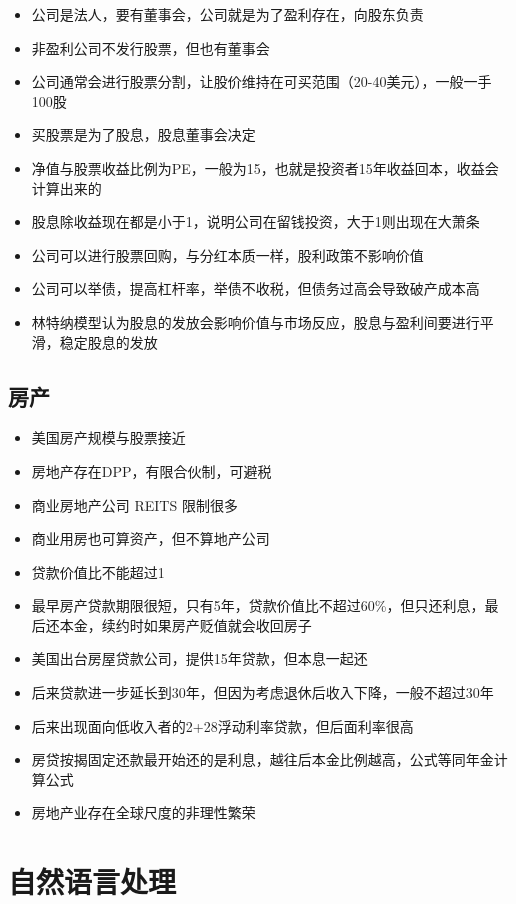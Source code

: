 \documentclass[]{book}
\providecommand{\tightlist}{%
  \setlength{\itemsep}{0pt}\setlength{\parskip}{0pt}}
\begin{document}
\begin{itemize}
\tightlist
\item
  公司是法人，要有董事会，公司就是为了盈利存在，向股东负责
\item
  非盈利公司不发行股票，但也有董事会
\item
  公司通常会进行股票分割，让股价维持在可买范围（20-40美元），一般一手100股
\item
  买股票是为了股息，股息董事会决定
\item
  净值与股票收益比例为PE，一般为15，也就是投资者15年收益回本，收益会计算出来的
\item
  股息除收益现在都是小于1，说明公司在留钱投资，大于1则出现在大萧条
\item
  公司可以进行股票回购，与分红本质一样，股利政策不影响价值
\item
  公司可以举债，提高杠杆率，举债不收税，但债务过高会导致破产成本高
\item
  林特纳模型认为股息的发放会影响价值与市场反应，股息与盈利间要进行平滑，稳定股息的发放
\end{itemize}

\section{房产}

\begin{itemize}
\tightlist
\item
  美国房产规模与股票接近
\item
  房地产存在DPP，有限合伙制，可避税
\item
  商业房地产公司 REITS 限制很多
\item
  商业用房也可算资产，但不算地产公司
\item
  贷款价值比不能超过1
\item
  最早房产贷款期限很短，只有5年，贷款价值比不超过60\%，但只还利息，最后还本金，续约时如果房产贬值就会收回房子
\item
  美国出台房屋贷款公司，提供15年贷款，但本息一起还
\item
  后来贷款进一步延长到30年，但因为考虑退休后收入下降，一般不超过30年
\item
  后来出现面向低收入者的2+28浮动利率贷款，但后面利率很高
\item
  房贷按揭固定还款最开始还的是利息，越往后本金比例越高，公式等同年金计算公式
\item
  房地产业存在全球尺度的非理性繁荣
\end{itemize}

\chapter{自然语言处理}
\end{document}
